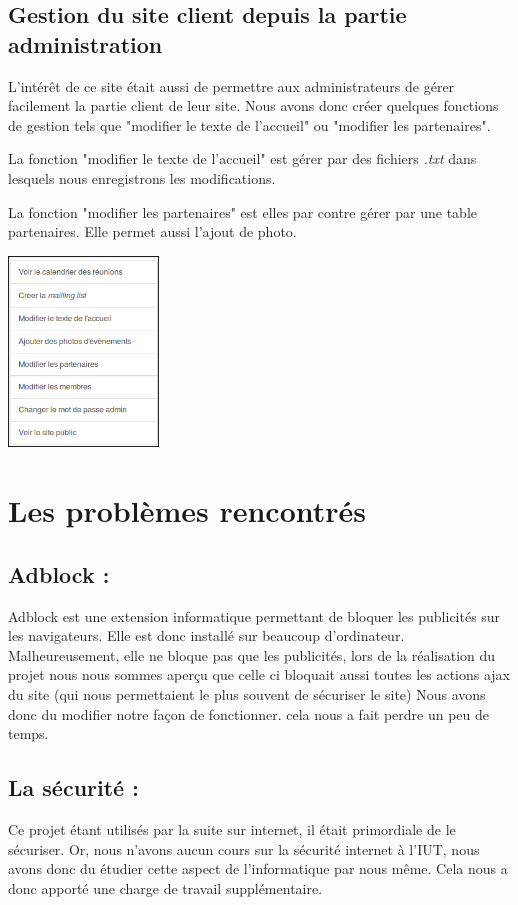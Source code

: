 \documentclass[11pt,a4paper,titlepage]{report}
\begin{document}
\section{Gestion du site client depuis la partie administration}
L'intérêt de ce site était aussi de permettre aux administrateurs de gérer facilement la partie client de leur site. Nous avons donc créer quelques fonctions de gestion tels que "modifier le texte de l'accueil" ou "modifier les partenaires". 

La fonction "modifier le texte de l'accueil" est gérer par des fichiers \textit{.txt} dans lesquels nous enregistrons les modifications.

La fonction "modifier les partenaires" est elles par contre gérer par une table partenaires. 
Elle permet aussi l'ajout de photo.

 

\begin{center}
\includegraphics[width=0.3\textwidth]{gestion.png}~
\end{center}

\chapter{Les problèmes rencontrés}

\section{Adblock :} 
Adblock est une extension informatique permettant de bloquer les publicités sur les navigateurs. Elle est donc installé sur beaucoup d'ordinateur. 
Malheureusement, elle ne bloque pas que les publicités, lors de la réalisation du projet nous nous sommes aperçu que celle ci bloquait aussi toutes les actions ajax du site (qui nous permettaient le plus souvent de sécuriser le site) 
Nous avons donc du modifier notre façon de fonctionner. cela nous a fait perdre un peu de temps.

\section{La sécurité : }
Ce projet étant utilisés par la suite sur internet, il était primordiale de le sécuriser. Or, nous n'avons aucun cours sur la sécurité internet à l'IUT, nous avons donc du étudier cette aspect de l'informatique par nous même. Cela nous a donc apporté une charge de travail supplémentaire.
\end{document}
